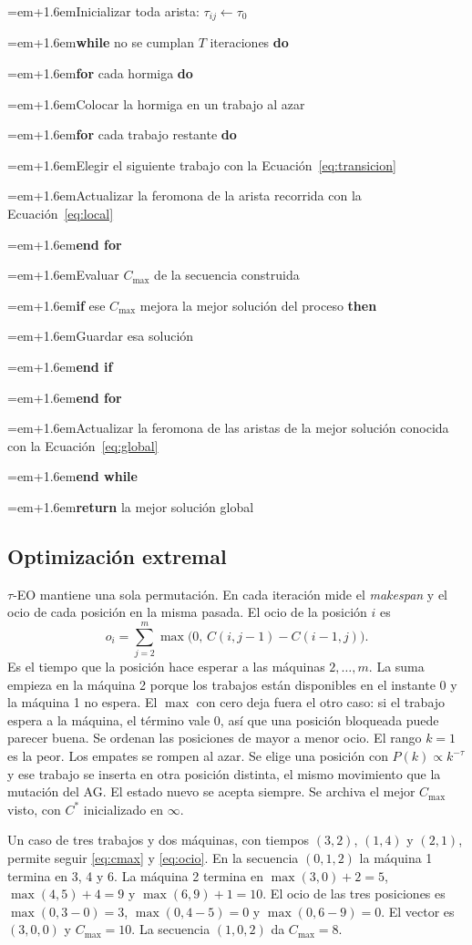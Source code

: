 \documentclass[journal]{IEEEtran}
\newcommand{\al}[2]{\par\noindent\hangindent=\dimexpr#1em+1.6em\relax\hangafter=1\hspace*{#1em}\li#2}
\newcounter{lin}\newcommand{\li}{\stepcounter{lin}\thelin:\ }
\begin{document}
\begin{algoritmo}[H]
  \caption{Sistema de colonia de hormigas (ACS).}\label{alg:acs}
  \footnotesize\setcounter{lin}{0}
  \al{0}{Inicializar toda arista: $\tau_{ij}\leftarrow\tau_0$}
  \al{0}{\textbf{while} no se cumplan $T$ iteraciones \textbf{do}}
  \al{1}{\textbf{for} cada hormiga \textbf{do}}
  \al{2}{Colocar la hormiga en un trabajo al azar}
  \al{2}{\textbf{for} cada trabajo restante \textbf{do}}
  \al{3}{Elegir el siguiente trabajo con la Ecuación~\eqref{eq:transicion}}
  \al{3}{Actualizar la feromona de la arista recorrida con la Ecuación~\eqref{eq:local}}
  \al{2}{\textbf{end for}}
  \al{2}{Evaluar $C_{\max}$ de la secuencia construida}
  \al{2}{\textbf{if} ese $C_{\max}$ mejora la mejor solución del proceso \textbf{then}}
  \al{3}{Guardar esa solución}
  \al{2}{\textbf{end if}}
  \al{1}{\textbf{end for}}
  \al{1}{Actualizar la feromona de las aristas de la mejor solución conocida con la Ecuación~\eqref{eq:global}}
  \al{0}{\textbf{end while}}
  \al{0}{\textbf{return} la mejor solución global}
\end{algoritmo}

\subsection{Optimización extremal}
$\tau$-EO mantiene una sola permutación. En cada iteración mide el \textit{makespan} y el ocio de cada posición en la misma pasada. El ocio de la posición $i$ es
\begin{equation}
  o_i=\sum_{j=2}^{m}\max\bigl(0,\,C(i,j-1)-C(i-1,j)\bigr).\label{eq:ocio}
\end{equation}
Es el tiempo que la posición hace esperar a las máquinas $2,\ldots,m$. La suma empieza en la máquina 2 porque los trabajos están disponibles en el instante 0 y la máquina 1 no espera. El $\max$ con cero deja fuera el otro caso: si el trabajo espera a la máquina, el término vale 0, así que una posición bloqueada puede parecer buena. Se ordenan las posiciones de mayor a menor ocio. El rango $k=1$ es la peor. Los empates se rompen al azar. Se elige una posición con $P(k)\propto k^{-\tau}$ y ese trabajo se inserta en otra posición distinta, el mismo movimiento que la mutación del AG. El estado nuevo se acepta siempre. Se archiva el mejor $C_{\max}$ visto, con $C^{*}$ inicializado en $\infty$.

Un caso de tres trabajos y dos máquinas, con tiempos $(3,2)$, $(1,4)$ y $(2,1)$, permite seguir \eqref{eq:cmax} y \eqref{eq:ocio}. En la secuencia $(0,1,2)$ la máquina 1 termina en 3, 4 y 6. La máquina 2 termina en $\max(3,0)+2=5$, $\max(4,5)+4=9$ y $\max(6,9)+1=10$. El ocio de las tres posiciones es $\max(0,3-0)=3$, $\max(0,4-5)=0$ y $\max(0,6-9)=0$. El vector es $(3,0,0)$ y $C_{\max}=10$. La secuencia $(1,0,2)$ da $C_{\max}=8$.
\end{document}
